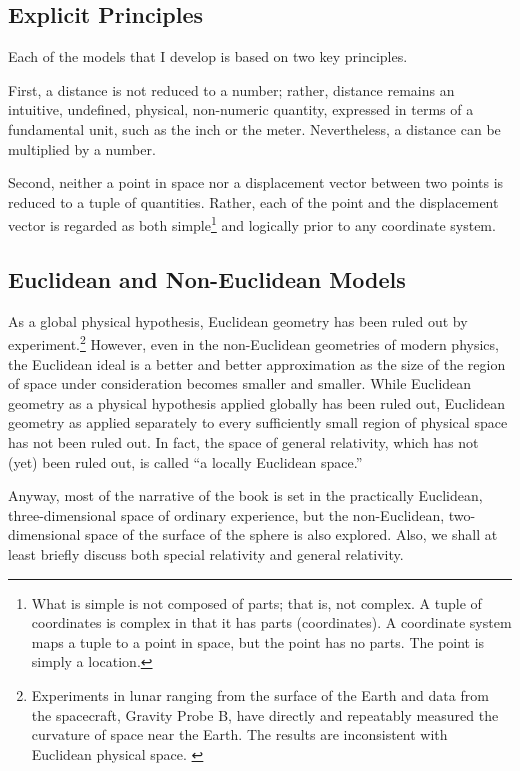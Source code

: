 \documentclass[twocolumn,10pt]{book}
\begin{document}
\subsection{Explicit Principles}

Each of the models that I develop is based on two key principles.

First, a distance is not reduced to a number; rather, distance remains an
intuitive, undefined, physical, non-numeric quantity, expressed in terms of a
fundamental unit, such as the inch or the meter.  Nevertheless, a distance can
be multiplied by a number.

Second, neither a point in space nor a displacement vector between two points
is reduced to a tuple of quantities.  Rather, each of the point and the
displacement vector is regarded as both simple\footnote{%
   What is simple is not composed of parts; that is, not complex.  A tuple of
   coordinates is complex in that it has parts (coordinates).  A coordinate
   system maps a tuple to a point in space, but the point has no parts.  The
   point is simply a location.%
}
and logically prior to any coordinate system.

\subsection{Euclidean and Non-Euclidean Models}

As a global physical hypothesis, Euclidean geometry has been ruled out by
experiment.\footnote{%
   Experiments in lunar ranging from the surface of the Earth and data from the
   spacecraft, Gravity Probe B, have directly and repeatably measured the
   curvature of space near the Earth. The results are inconsistent with
   Euclidean physical space.  \citep{gpb-2011, miller-geodetic}
}
However, even in the non-Euclidean geometries of modern physics, the Euclidean
ideal is a better and better approximation as the size of the region of space
under consideration becomes smaller and smaller.  While Euclidean geometry as a
physical hypothesis applied globally has been ruled out, Euclidean geometry as
applied separately to every sufficiently small region of physical space has not
been ruled out.  In fact, the space of general relativity, which has not (yet)
been ruled out, is called ``a locally Euclidean space.''

Anyway, most of the narrative of the book is set in the practically Euclidean,
three-dimensional space of ordinary experience, but the non-Euclidean,
two-dimensional space of the surface of the sphere is also explored.  Also, we
shall at least briefly discuss both special relativity and general relativity.
\end{document}
